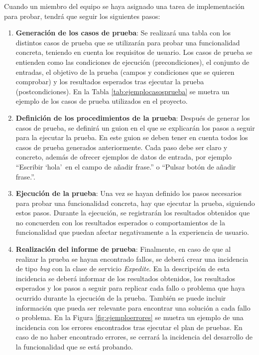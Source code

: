 Cuando un miembro del equipo se haya asignado una tarea de implementación para probar, tendrá que seguir los siguientes pasos:
\begin{enumerate}
  \item \textbf{Generación de los casos de prueba}: Se realizará una tabla con los distintos casos de prueba que se utilizarán para probar una funcionalidad concreta, teniendo en cuenta los requisitos de usuario. Los casos de prueba se entienden como las condiciones de ejecución (precondiciones), el conjunto de entradas, el objetivo de la prueba (campos y condiciones que se quieren comprobar) y los resultados esperados tras ejecutar la prueba (postcondiciones). En la Tabla \ref{tab:ejemplocasosprueba} se muetra un ejemplo de los casos de prueba utilizados en el proyecto.
  \item \textbf{Definición de los procedimientos de la prueba}: Después de generar los casos de prueba, se definirá un guion en el que se explicarán los pasos a seguir para la ejecutar la prueba. En este guion se deben tener en cuenta todos los casos de prueba generados anteriormente. Cada paso debe ser claro y concreto, además de ofrecer ejemplos de datos de entrada, por ejemplo ``Escribir `hola'\, en el campo de añadir frase.'' o ``Pulsar botón de añadir frase.''.
  \item \textbf{Ejecución de la prueba}: Una vez se hayan definido los pasos necesarios para probar una funcionalidad concreta, hay que ejecutar la prueba, siguiendo estos pasos. Durante la ejecución, se registrarán los resultados obtenidos que no concuerden con los resultados esperados o comportamientos de la funcionalidad que puedan afectar negativamente a la experiencia de usuario.
  \item \textbf{Realización del informe de prueba}: Finalmente, en caso de que al realizar la prueba se hayan encontrado fallos, se deberá crear una incidencia de tipo \textit{bug} con la clase de servicio \textit{Expedite}. En la descripción de esta incidencia se deberá informar de los resultados obtenidos, los resultados esperados y los pasos a seguir para replicar cada fallo o problema que haya ocurrido durante la ejecución de la prueba. También se puede incluir información que pueda ser relevante para encontrar una solución a cada fallo o problema. En la Figura \ref{fig:ejemploerrores} se muetra un ejemplo de una incidencia con los errores encontrados tras ejecutar el plan de pruebas. En caso de no haber encontrado errores, se cerrará la incidencia del desarrollo de la funcionalidad que se está probando.
\end{enumerate}

